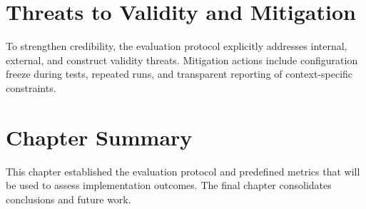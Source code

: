 \section{Threats to Validity and Mitigation}

To strengthen credibility, the evaluation protocol explicitly addresses internal, external, and construct validity threats. Mitigation actions include configuration freeze during tests, repeated runs, and transparent reporting of context-specific constraints.

\section{Chapter Summary}

This chapter established the evaluation protocol and predefined metrics that will be used to assess implementation outcomes. The final chapter consolidates conclusions and future work.
